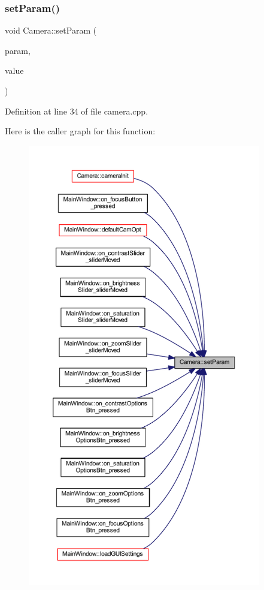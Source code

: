 \subsubsection{\texorpdfstring{setParam()}{setParam()}}
{\footnotesize\ttfamily void Camera\+::set\+Param (\begin{DoxyParamCaption}\item[{Video\+Capture\+Properties}]{param,  }\item[{int}]{value }\end{DoxyParamCaption})}



Definition at line 34 of file camera.\+cpp.

Here is the caller graph for this function\+:
\nopagebreak
\begin{figure}[H]
\begin{center}
\leavevmode
\includegraphics[height=550pt]{class_camera_a9c9ba5d6bed27bdd033ea40280741cf9_icgraph}
\end{center}
\end{figure}


